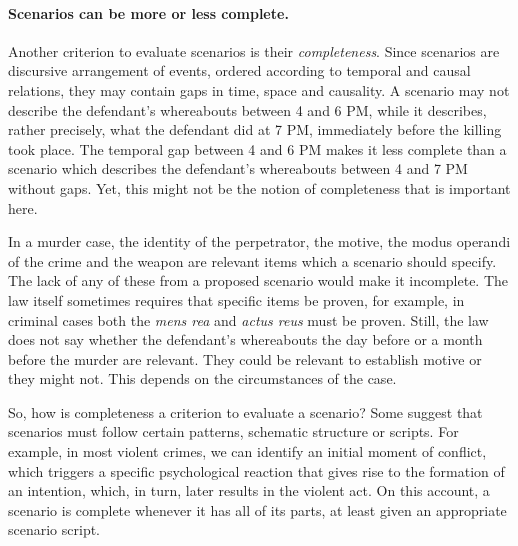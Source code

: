 \documentclass[10pt]{article}
\begin{document}
\paragraph{Scenarios can be more or less complete.}

Another criterion to evaluate scenarios is their \textit{completeness}. Since scenarios are discursive arrangement of events, ordered according to 
temporal and causal relations, they may contain gaps in time, space and causality. A scenario may not describe the defendant's whereabouts between 4 and 6 PM, 
while it describes, rather precisely, what the defendant did at 7 PM, immediately before the killing took place. The temporal gap between 4 and 6 PM 
makes it less complete than a scenario which describes the defendant's whereabouts between 4 and 7 PM without gaps. 
Yet, this might not be the notion of completeness that is important here.  

In a murder case, the identity of the perpetrator, the motive, the 
modus operandi of the crime and the weapon are relevant items which a scenario should specify. 
The lack of any of these from a proposed scenario would make it incomplete. 
The law itself sometimes requires that specific items be proven, 
for example, in criminal cases both the \textit{mens rea} and \textit{actus reus} 
must be proven.   Still, the law does not say whether the defendant's whereabouts the day before or a month before 
the murder are relevant. They could be relevant to establish motive or they might not. 
This depends on the circumstances of the case.

So, how is completeness a criterion to evaluate a scenario? Some suggest that scenarios must follow certain patterns, 
schematic structure or scripts. For example, in most violent crimes, we can identify an initial 
moment of conflict, which triggers a specific psychological reaction that gives rise to the formation of an 
intention, which, in turn, later results in the violent act. On this account, a scenario is 
complete whenever it has all of its parts, at least given an appropriate scenario script.

\end{document}
